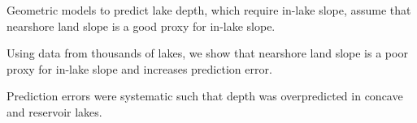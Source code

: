 \documentclass[draft]{agujournal2019}
\begin{document}




\begin{keypoints}
\item Geometric models to predict lake depth, which require in-lake slope, assume that nearshore land slope is a good proxy for in-lake slope.
\item Using data from thousands of lakes, we show that nearshore land slope is a poor proxy for in-lake slope and increases prediction error.
\item Prediction errors were systematic such that depth was overpredicted in concave and reservoir lakes.
\end{keypoints}

%
%
\end{document}
